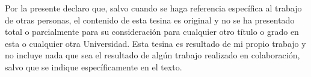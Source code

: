 
\begin{declaration}

Por la presente declaro que, salvo cuando se haga referencia específica al trabajo de otras personas, el contenido de esta tesina es original y no se ha presentado total o parcialmente para su consideración para cualquier otro título o grado en esta o cualquier otra Universidad. Esta tesina es resultado de mi propio trabajo y no incluye nada que sea el resultado de algún trabajo realizado en colaboración, salvo que se indique específicamente en el texto. 

\end{declaration}
